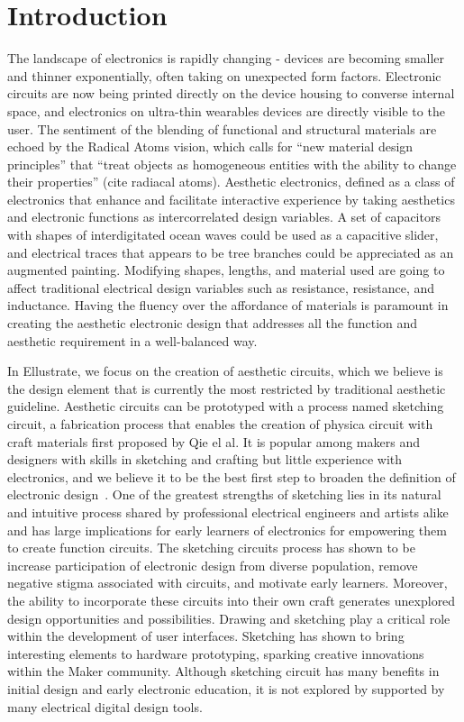 \documentclass{sigchi}
\begin{document}
\section{Introduction}
The landscape of electronics is rapidly changing - devices are becoming smaller and thinner exponentially, often taking on unexpected form factors. Electronic circuits are now being printed directly on the device housing to converse internal space, and electronics on ultra-thin wearables devices are directly visible to the user. 
The sentiment of the blending of functional and structural materials are echoed by the Radical Atoms vision, which calls for “new material design principles” that “treat objects as homogeneous entities with the ability to change their properties” (cite radiacal atoms).  Aesthetic electronics, defined as a class of electronics that enhance and facilitate interactive experience by taking aesthetics and electronic functions as intercorrelated design variables. A set of capacitors with shapes of interdigitated ocean waves could be used as a capacitive slider, and electrical traces that appears to be tree branches could be appreciated as an augmented painting. Modifying shapes, lengths, and material used are going to affect traditional electrical design variables such as resistance, resistance, and inductance. Having the fluency over the affordance of materials is paramount in creating the aesthetic electronic design that addresses all the function and aesthetic requirement in a well-balanced way. 

In Ellustrate, we focus on the creation of aesthetic circuits, which we believe is the design element that is currently the most restricted by traditional aesthetic guideline. Aesthetic circuits can be prototyped with a process named sketching circuit, a fabrication process that enables the creation of physica circuit with craft materials first proposed by Qie el al. It is popular among makers and designers with skills in sketching and crafting but little experience with electronics, and we believe it to be the best first step to broaden the definition of electronic design~\cite{qi_sketching_2014, qi_stickers_2015}. One of the greatest strengths of sketching lies in its natural and intuitive process shared by professional electrical engineers and artists alike and has large implications for early learners of electronics for empowering them to create function circuits. The sketching circuits process has shown to be increase participation of electronic design from diverse population, remove negative stigma associated with circuits, and motivate early learners. Moreover, the ability to incorporate these circuits into their own craft generates unexplored design opportunities and possibilities. 
Drawing and sketching play a critical role within the development of user interfaces. Sketching has shown to bring interesting elements to hardware prototyping, sparking creative innovations within the Maker community. 
Although sketching circuit has many benefits in initial design and early electronic education, it is not explored by supported by many electrical digital design tools.
\end{document}
